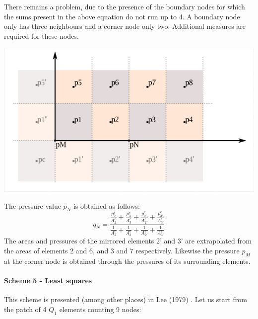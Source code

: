 There remains a problem, due to the presence of the boundary nodes for which 
the sums present in the above equation do not run up to 4. A boundary
node only has three neighbours and a corner node only two. Additional measures
are required for these nodes. 

\begin{center}
\includegraphics[width=0.5\linewidth]{images/pressure_smoothing/newalgo_corner.png}
\end{center}

The pressure value $p_N$ is obtained as follows:
\[
q_N = \frac{ 
 \frac{p_2^e}   {A_2^e}
+\frac{p_3^e}   {A_3^e}
+\frac{p_{2'}^e}{A_{2'}^e}
+\frac{p_{3'}^e}{A_{3'}^e}
}{
 \frac{1}{A_2^e}
+\frac{1}{A_3^e}
+\frac{1}{A_{2'}^e}
+\frac{1}{A_{3'}^e}
}
\]
The areas and pressures of the mirrored elements 2' and 3' are extrapolated from the areas of elements 2 and 6, and 3 and 7 respectively. 
Likewise the pressure $p_M$ at the corner node is obtained through the pressures of its surrounding elements.


\paragraph{Scheme 5 - Least squares} This scheme is presented (among other places) in Lee \etal (1979)
\cite{legs79}. 
Let us start from the patch of 4 $Q_1$ elements counting 9 nodes: 

